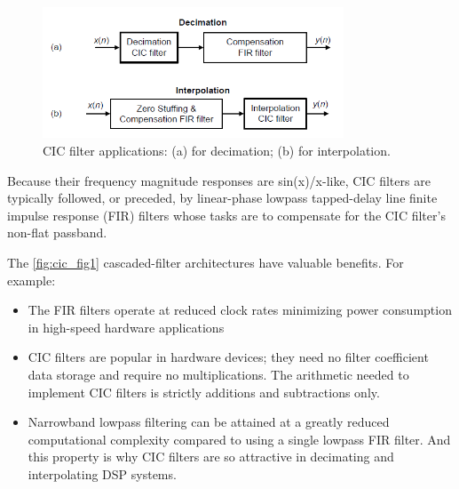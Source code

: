 \begin{figure}[!ht]
    \centering
    \includegraphics[width=0.8\textwidth]{images/CIC_Filter/CIC_digital_filters_fig1.png}
    \caption{CIC filter applications: (a) for decimation; (b) for interpolation.}
    \label{fig:cic_fig1}
\end{figure}
Because their frequency magnitude responses are sin(x)/x-like, CIC filters are typically followed, or preceded, by linear-phase lowpass tapped-delay line finite impulse response (FIR) filters whose tasks are to compensate for the CIC filter's non-flat passband. 

The \autoref{fig:cic_fig1} cascaded-filter architectures have valuable benefits. For example:
\begin{itemize}
    \item The FIR filters operate at reduced clock rates minimizing power consumption in high-speed hardware applications 
    \item CIC filters are popular in hardware devices; they need no filter coefficient data storage and require no multiplications. The arithmetic needed to implement CIC filters is strictly additions and subtractions only.
    \item Narrowband lowpass filtering can be attained at a greatly reduced computational complexity compared to using a single lowpass FIR filter. And this property is why CIC filters are so attractive in decimating and interpolating DSP systems.
\end{itemize}
